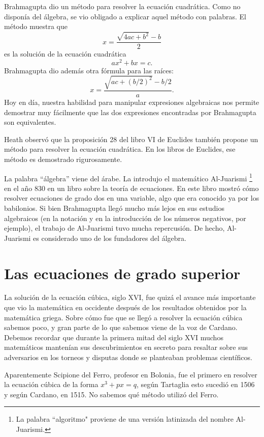 Brahmagupta dio un método para resolver la ecuación cuadrática. Como no
disponía del álgebra, se vio obligado a explicar 
aquel método con palabras. El
método muestra que 
\[
x=\frac{\sqrt{4ac+b^2}-b}{2}
\]
es la solución de la ecuación cuadrática 
\[
	ax^2+bx=c.
\]
Brahmagupta dio además otra fórmula para las raíces:
\[
	x=\frac{\sqrt{ac+(b/2)^2}-b/2}{a}.
\]
Hoy en día, nuestra habilidad para manipular expresiones algebraicas nos
permite demostrar muy fácilmente que las dos expresiones encontradas por
Brahmagupta son equivalentes.

Heath observó que la proposición 28 del libro VI de Euclides también propone un
método para resolver la ecuación cuadrática. En los libros de Euclides, 
ese método es demostrado
rigurosamente.


La palabra ``álgebra'' viene del árabe. La introdujo el matemático Al-Juarismi
\footnote{La palabra ``algoritmo" proviene de una versión latinizada del nombre 
Al-Juarismi.} en el año 830 en un libro sobre la teoría de ecuaciones. 
En este libro mostró
cómo resolver ecuaciones de grado dos en una variable, algo que era conocido ya
por los babilonios.  Si bien Brahmagupta llegó mucho más lejos en
sus estudios algebraicos (en la notación y en la introducción de los
números negativos, por ejemplo), el trabajo de Al-Juarismi tuvo mucha
repercusión. De hecho, Al-Juarismi es considerado uno de los 
fundadores del álgebra. 

\section*{Las ecuaciones de grado superior}

La solución de la ecuación cúbica, siglo XVI, fue quizá el avance más
importante que vio la matemática en occidente después de los resultados
obtenidos por la matemática griega. Sobre cómo fue que se llegó a resolver la
ecuación cúbica sabemos poco, y gran parte de lo que sabemos viene de la voz de
Cardano. Debemos recordar que durante la primera mitad del siglo XVI muchos matemáticos
mantenían sus descubrimientos en secreto para resaltar sobre sus adversarios en
los torneos y disputas donde se planteaban problemas científicos.

Aparentemente Scipione del Ferro, profesor en Bolonia, fue el primero en
resolver la ecuación cúbica de la forma $x^3+px=q$, según Tartaglia esto
sucedió en 1506 y según Cardano, en 1515. No sabemos qué método utilizó del
Ferro. 

